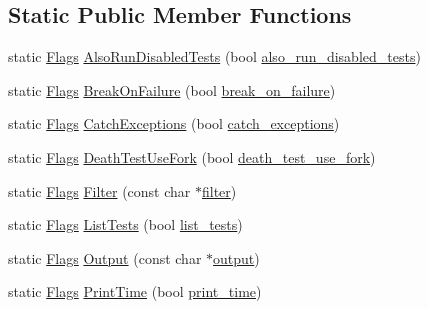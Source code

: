 \subsection*{Static Public Member Functions}
\begin{DoxyCompactItemize}
\item 
static \hyperlink{structtesting_1_1_flags}{Flags} \hyperlink{structtesting_1_1_flags_a8bee2b5f94d8248b6791d6b005db146f}{Also\+Run\+Disabled\+Tests} (bool \hyperlink{structtesting_1_1_flags_a8ebf8c68f918b9039926b569c880f910}{also\+\_\+run\+\_\+disabled\+\_\+tests})
\item 
static \hyperlink{structtesting_1_1_flags}{Flags} \hyperlink{structtesting_1_1_flags_a62660e44922321f7640bc951a04c2296}{Break\+On\+Failure} (bool \hyperlink{structtesting_1_1_flags_acccce2a9673bb61751269d2ef9c21c89}{break\+\_\+on\+\_\+failure})
\item 
static \hyperlink{structtesting_1_1_flags}{Flags} \hyperlink{structtesting_1_1_flags_a2c7d89f62f4328ae0ced66154ef96b44}{Catch\+Exceptions} (bool \hyperlink{structtesting_1_1_flags_a06984d0553f09716e1bd9f159e7cc644}{catch\+\_\+exceptions})
\item 
static \hyperlink{structtesting_1_1_flags}{Flags} \hyperlink{structtesting_1_1_flags_a4468e5625833043596c44be174349d8c}{Death\+Test\+Use\+Fork} (bool \hyperlink{structtesting_1_1_flags_a7cdef4e6e102771fc15940931dd07e5c}{death\+\_\+test\+\_\+use\+\_\+fork})
\item 
static \hyperlink{structtesting_1_1_flags}{Flags} \hyperlink{structtesting_1_1_flags_afc7350b7c1ac4c0e0efe2d9a94729eb7}{Filter} (const char $\ast$\hyperlink{structtesting_1_1_flags_aa52c1048a7e3cbe726ed4160f2e05d14}{filter})
\item 
static \hyperlink{structtesting_1_1_flags}{Flags} \hyperlink{structtesting_1_1_flags_a825a5d763a31fe6c28f543990bd336df}{List\+Tests} (bool \hyperlink{structtesting_1_1_flags_a3c73f29131074146224018066379fb2f}{list\+\_\+tests})
\item 
static \hyperlink{structtesting_1_1_flags}{Flags} \hyperlink{structtesting_1_1_flags_a507916734a6d7ff2dd02891d7849f2d3}{Output} (const char $\ast$\hyperlink{structtesting_1_1_flags_a8c8289b3af9310744bc25280e3980e4b}{output})
\item 
static \hyperlink{structtesting_1_1_flags}{Flags} \hyperlink{structtesting_1_1_flags_af4dc8454995fb3691399a049e95de179}{Print\+Time} (bool \hyperlink{structtesting_1_1_flags_a8758d574ce5513402679df258f788733}{print\+\_\+time})
\item 

\end{DoxyCompactItemize}
